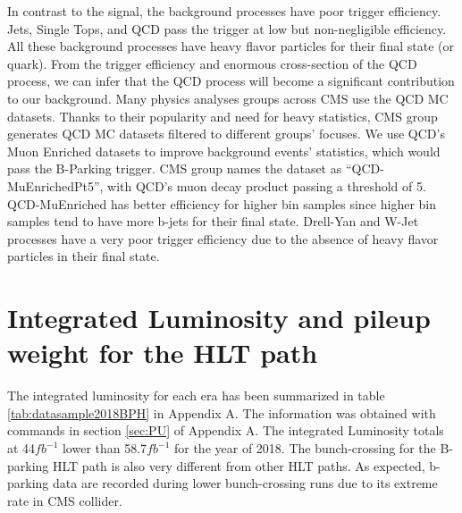 In contrast to the signal, the background processes have poor trigger efficiency.
\ttbar Jets, Single Tops, and QCD pass the trigger at low but non-negligible efficiency.
All these background processes have heavy flavor particles for their final state (\PQb or \PQt quark).
From the trigger efficiency and enormous cross-section of the QCD process, we can infer that the QCD process will become a significant contribution to our background.
Many physics analyses groups across CMS use the QCD MC datasets.
Thanks to their popularity and need for heavy statistics, CMS group generates QCD MC datasets filtered to different groups' focuses.
We use QCD's Muon Enriched datasets to improve background events' statistics, which would pass the B-Parking trigger.
CMS group names the dataset as ``QCD-MuEnrichedPt5'', with QCD's muon decay product passing a \pt threshold of 5\GeV.
QCD-MuEnriched has better efficiency for higher \pt bin samples since higher \pt bin samples tend to have more b-jets for their final state.
Drell-Yan and W-Jet processes have a very poor trigger efficiency due to the absence of heavy flavor particles in their final state.


\section{Integrated Luminosity and pileup weight for the HLT path}
The integrated luminosity for each era has been summarized in table \ref{tab:datasample2018BPH} in Appendix A.
The information was obtained with commands in section \ref{sec:PU} of Appendix A.
The integrated Luminosity totals at 44$fb^{-1}$ lower than 58.7$fb^{-1}$ for the year of 2018.
The bunch-crossing for the B-parking HLT path is also very different from other HLT paths.
As expected, b-parking data are recorded during lower bunch-crossing runs due to its extreme rate in CMS collider.


